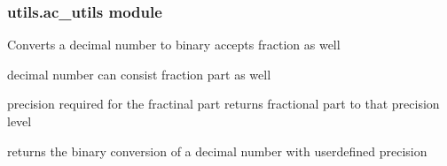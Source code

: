 \documentclass[letterpaper,10pt,english]{sphinxmanual}
\begin{document}
\subsubsection{utils.ac\_utils module}
\label{\detokenize{utils:module-utils.ac_utils}}\label{\detokenize{utils:utils-ac-utils-module}}

\begin{fulllineitems}
\label{\detokenize{utils:utils.ac_utils.decToBinConversion}}
\pysigstartsignatures
{}
\pysigstopsignatures
\sphinxAtStartPar
Converts a decimal number to binary accepts fraction as well
\begin{description}
\begin{description}
\sphinxAtStartPar
decimal number can consist fraction part as well

\sphinxAtStartPar
precision required for the fractinal part returns fractional part to that precision level

\end{description}

\begin{description}
\sphinxAtStartPar
returns the binary conversion of a decimal number with user\sphinxhyphen{}defined precision

\end{description}

\end{description}

\end{fulllineitems}

\end{document}
